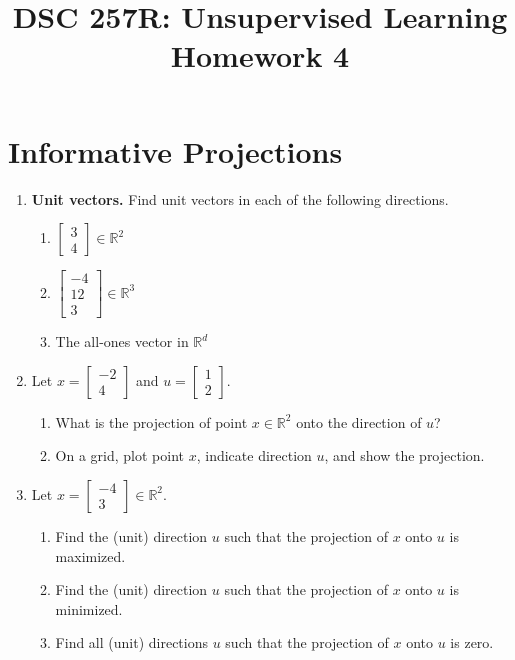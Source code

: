 \documentclass{article}
\title{DSC 257R: Unsupervised Learning \\ Homework 4}
\author{}
\date{}
\begin{document}
\maketitle

\section*{Informative Projections}

\begin{enumerate}
\item \textbf{Unit vectors.} Find unit vectors in each of the following directions.
    \begin{enumerate}
    \item $\begin{bmatrix}3 \\ 4\end{bmatrix} \in \mathbb{R}^{2}$
    \item $\begin{bmatrix}-4 \\ 12 \\ 3\end{bmatrix} \in \mathbb{R}^{3}$
    \item The all-ones vector in $\mathbb{R}^{d}$
    \end{enumerate}

\item Let $x=\begin{bmatrix}-2 \\ 4\end{bmatrix}$ and $u=\begin{bmatrix}1 \\ 2\end{bmatrix}$.
    \begin{enumerate}
    \item What is the projection of point $x \in \mathbb{R}^{2}$ onto the direction of $u$?
    \item On a grid, plot point $x$, indicate direction $u$, and show the projection.
    \end{enumerate}

\item Let $x=\begin{bmatrix}-4 \\ 3\end{bmatrix} \in \mathbb{R}^{2}$.
    \begin{enumerate}
    \item Find the (unit) direction $u$ such that the projection of $x$ onto $u$ is maximized.
    \item Find the (unit) direction $u$ such that the projection of $x$ onto $u$ is minimized.
    \item Find all (unit) directions $u$ such that the projection of $x$ onto $u$ is zero.
    \end{enumerate}


\end{enumerate}
\end{document}
